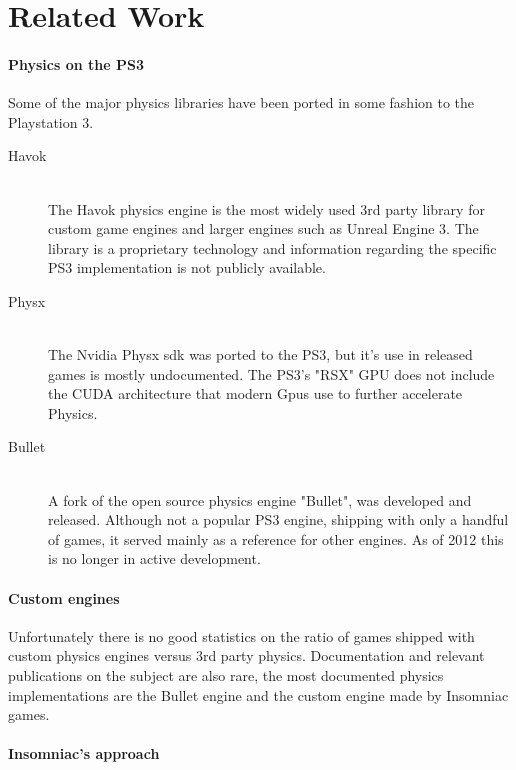 \documentclass[conference]{acmsiggraph}
\begin{document}
\section{Related Work}



\paragraph{Physics on the PS3}
Some of the major physics libraries have been ported in some fashion to the Playstation 3.
\begin{description}
  \item[Havok] \hfill \\
   The Havok physics engine is the most widely used 3rd party library for custom game engines and larger engines such as Unreal Engine 3. The library is a proprietary  technology and information regarding the specific PS3 implementation is not publicly available.
  \item[Physx] \hfill \\
  The Nvidia Physx sdk was ported to the PS3, but it's use in released games is mostly undocumented. The PS3's "RSX" GPU does not include the CUDA architecture that modern Gpus use to further accelerate Physics.
  \item[Bullet] \hfill \\
  A fork of the open source physics engine "Bullet", was developed and released. Although not a popular PS3 engine, shipping with only a handful of games, it served mainly as a reference for other engines. As of 2012 this is no longer in active development.
\end{description}

\paragraph{Custom engines}
Unfortunately there is no good statistics on the ratio of games shipped with custom physics engines versus 3rd party physics. 
Documentation and relevant publications on the subject are also rare, the most documented physics implementations are the Bullet engine and the custom engine made by Insomniac games.

\paragraph{Insomniac's approach}
\end{document}

